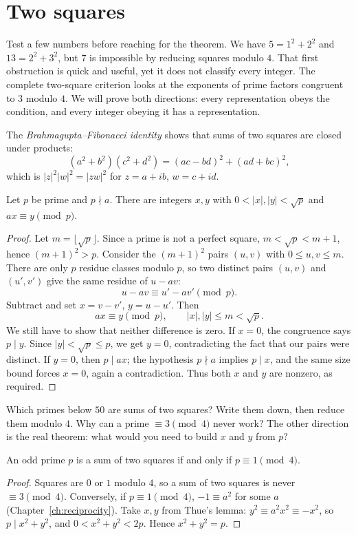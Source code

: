 \section{Two squares}

Test a few numbers before reaching for the theorem. We have $5=1^2+2^2$ and $13=2^2+3^2$, but $7$ is impossible by reducing squares modulo $4$. That first obstruction is quick and useful, yet it does not classify every integer. The complete two-square criterion looks at the exponents of prime factors congruent to $3$ modulo $4$. We will prove both directions: every representation obeys the condition, and every integer obeying it has a representation.

The \emph{Brahmagupta--Fibonacci identity} shows that sums of two squares are closed under products:
\[
(a^2+b^2)(c^2+d^2)=(ac-bd)^2+(ad+bc)^2,
\]
which is $|z|^2|w|^2=|zw|^2$ for $z=a+ib$, $w=c+id$.

\begin{lemma}[Thue]\label{lem:thue}
Let $p$ be prime and $p\nmid a$. There are integers $x,y$ with $0<|x|,|y|<\sqrt p$ and $ax\equiv y\pmod p$.
\end{lemma}
\begin{proof}
Let $m=\lfloor\sqrt p\rfloor$.
Since a prime is not a perfect square,
$m<\sqrt p<m+1$, hence
$(m+1)^2>p$. Consider the $(m+1)^2$
pairs $(u,v)$ with $0\le u,v\le m$.
There are only $p$ residue classes modulo $p$,
so two distinct pairs $(u,v)$ and $(u',v')$
give the same residue of $u-av$:
\[
u-av\equiv u'-av'\pmod p.
\]
Subtract and set $x=v-v'$, $y=u-u'$.
Then
\[
ax\equiv y\pmod p,\qquad |x|,|y|\le m<\sqrt p.
\]
We still have to show that neither difference
is zero. If $x=0$, the congruence says
$p\mid y$. Since $|y|<\sqrt p\le p$,
we get $y=0$, contradicting the fact
that our pairs were distinct.
If $y=0$, then $p\mid ax$; the hypothesis
$p\nmid a$ implies $p\mid x$, and the
same size bound forces $x=0$, again a
contradiction. Thus both $x$ and $y$
are nonzero, as required.
\end{proof}

\begin{think}
Which primes below $50$ are sums of two squares? Write them down, then reduce them modulo $4$. Why can a prime $\equiv3\pmod4$ never work? The other direction is the real theorem: what would you need to build $x$ and $y$ from $p$?
\end{think}

\begin{theorem}\label{thm:twosq}
An odd prime $p$ is a sum of two squares if and only if $p\equiv1\pmod4$.
\end{theorem}
\begin{proof}
Squares are $0$ or $1$ modulo $4$, so a sum of two squares is never $\equiv3\pmod4$. Conversely, if $p\equiv1\pmod4$, $-1\equiv a^2$ for some $a$ (Chapter~\ref{ch:reciprocity}). Take $x,y$ from Thue's lemma: $y^2\equiv a^2x^2\equiv-x^2$, so $p\mid x^2+y^2$, and $0<x^2+y^2<2p$. Hence $x^2+y^2=p$.
\end{proof}

